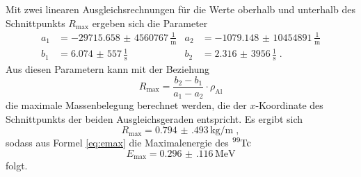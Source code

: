 \FloatBarrier
\noindent
Mit zwei linearen Ausgleichsrechnungen für die Werte oberhalb und unterhalb des Schnittpunkts $R_\text{max}$ ergeben
sich die Parameter
\begin{align*}
    a_1 &= \num{-29715,658(4560767)} \, \frac{1}{\si{\meter}} & a_2 &= \num{-1079,148(10454891)} \, \frac{1}{\si{\meter}} \\
    b_1 &= \num{6,074(557)} \, \frac{1}{\si{\second}}         & b_2 &= \num{2,316(3956)} \, \frac{1}{\si{\second}} \; .
\end{align*}
Aus diesen Parametern kann mit der Beziehung
\begin{equation*}
    R_{\text{max}} = \frac{b_2 - b_1}{a_1 - a_2} \cdot \rho_\text{Al}
\end{equation*}
die maximale Massenbelegung berechnet werden, die der $x$-Koordinate des Schnittpunkts der beiden Ausgleichsgeraden entspricht.
Es ergibt sich 
\begin{equation*}
    R_{\text{max}} = \num{0.794(493)} \, \si{\kilo\gram\per\meter} \; ,
\end{equation*}
sodass aus Formel \eqref{eq:emax} die Maximalenergie des $\ce{^{99}Tc}$ 
\begin{equation*}
    E_\text{max}  = \num{0.296(116)} \, \si{\mega\electronvolt}
\end{equation*}
folgt.

